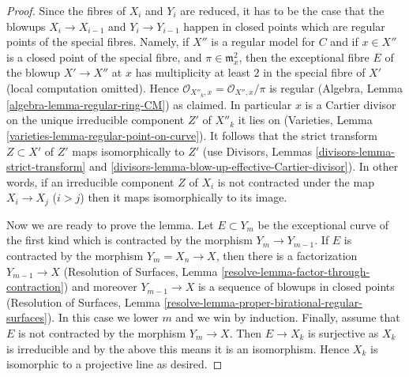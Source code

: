 \documentclass[10pt,a4paper]{amsart}
\theoremstyle{plain}
\theoremstyle{definition}
\theoremstyle{remark}
\numberwithin{equation}{subsection}
\begin{document}
\begin{proof}
\medskip\noindent
Since the fibres of $X_i$ and $Y_i$ are reduced, it has to be the
case that the blowups $X_i \to X_{i - 1}$ and $Y_i \to Y_{i - 1}$
happen in closed points which are regular points of the special fibres.
Namely, if $X''$ is a regular model for $C$ and if $x \in X''$
is a closed point of the special fibre, and
$\pi \in \mathfrak m_x^2$, then the exceptional fibre $E$ of the
blowup $X' \to X''$ at $x$ has multiplicity at least $2$ in the
special fibre of $X'$ (local computation omitted).
Hence $\mathcal{O}_{X''_k, x} = \mathcal{O}_{X'', x}/\pi$ is
regular (Algebra, Lemma \ref{algebra-lemma-regular-ring-CM}) as claimed.
In particular $x$ is a Cartier divisor on the unique
irreducible component $Z'$ of $X''_k$ it lies on
(Varieties, Lemma \ref{varieties-lemma-regular-point-on-curve}).
It follows that the strict transform $Z \subset X'$ of $Z'$
maps isomorphically to $Z'$
(use Divisors, Lemmas \ref{divisors-lemma-strict-transform} and
\ref{divisors-lemma-blow-up-effective-Cartier-divisor}).
In other words, if an irreducible component $Z$ of $X_i$
is not contracted under the map $X_i \to X_j$ ($i > j$)
then it maps isomorphically to its image.

\medskip\noindent
Now we are ready to prove the lemma.
Let $E \subset Y_m$ be the exceptional curve of the first kind
which is contracted by the morphism $Y_m \to Y_{m - 1}$. If $E$ is
contracted by the morphism $Y_m = X_n \to X$, then there is a factorization
$Y_{m - 1} \to X$ (Resolution of Surfaces, Lemma
\ref{resolve-lemma-factor-through-contraction})
and moreover $Y_{m - 1} \to X$ is a sequence of blowups
in closed points (Resolution of Surfaces, Lemma
\ref{resolve-lemma-proper-birational-regular-surfaces}).
In this case we lower $m$ and we win by induction.
Finally, assume that $E$ is not contracted by the morphism $Y_m \to X$.
Then $E \to X_k$ is surjective as $X_k$ is irreducible
and by the above this means it is an isomorphism.
Hence $X_k$ is isomorphic to a projective line as desired.
\end{proof}



\end{document}

